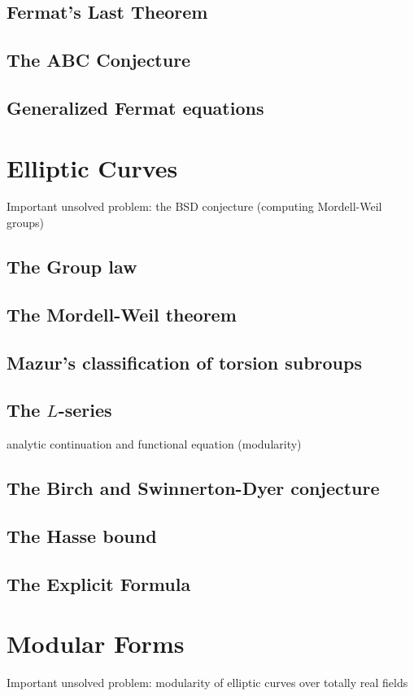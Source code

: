 \documentclass{book}
\theoremstyle{plain}
\theoremstyle{definition}
\numberwithin{equation}{section}
\numberwithin{figure}{section}
\numberwithin{table}{section}
\begin{document}
\section{Fermat's Last Theorem}
\section{The ABC Conjecture}
\section{Generalized Fermat equations}



\chapter{Elliptic Curves}
Important unsolved problem: the BSD conjecture (computing Mordell-Weil groups)

\section{The Group law}
\section{The Mordell-Weil theorem}
\section{Mazur's classification of torsion subroups}
\section{The $L$-series}
analytic continuation and functional equation (modularity)
\section{The Birch and Swinnerton-Dyer conjecture}
\section{The Hasse bound}
\section{The Explicit Formula}



\chapter{Modular Forms}
Important unsolved problem: modularity of elliptic curves
over totally real fields
\end{document}
